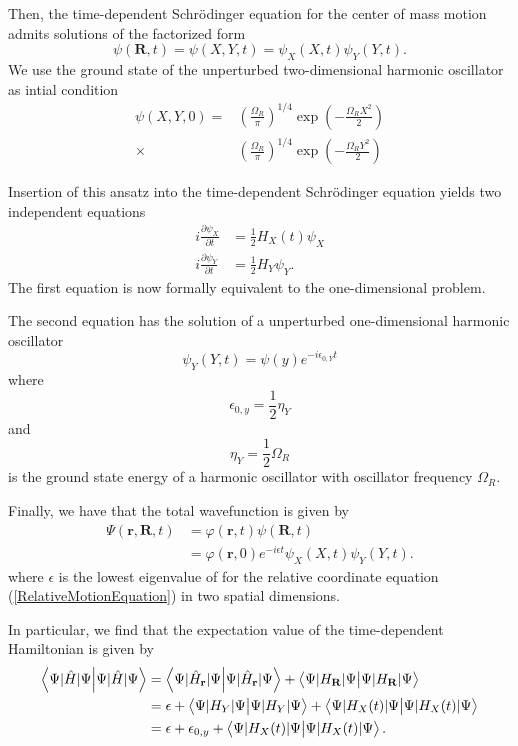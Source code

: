 \documentclass[aip,jcp,reprint,floatfix]{revtex4-1}
\begin{document}
\begin{appendices}
Then, the time-dependent Schrödinger equation for the center of mass motion admits solutions of the factorized form
\begin{equation}
    \psi(\mathbf{R},t) = \psi(X,Y,t) = \psi_X(X,t) \psi_Y(Y,t).
\end{equation}
We use the ground state of the unperturbed two-dimensional harmonic oscillator as intial condition
\begin{align}
    \psi(X,Y,0) = &\left( \frac{\Omega_R}{\pi} \right)^{1/4} \exp\left(-\frac{\Omega_R X^2}{2}\right) \nonumber \\ 
    \times &\left( \frac{\Omega_R}{\pi} \right)^{1/4} \exp\left(-\frac{\Omega_R Y^2}{2}\right)
\end{align}

Insertion of this ansatz into the time-dependent Schrödinger equation yields two independent equations 
\begin{align}
    i \frac{\partial \psi_X}{\partial t} &= \frac{1}{2} H_X(t) \psi_X \\
    i \frac{\partial \psi_Y}{\partial t} &= \frac{1}{2} H_Y \psi_Y. 
\end{align}
The first equation is now formally equivalent to the one-dimensional problem. 

The second equation has the solution of a unperturbed one-dimensional harmonic oscillator 
\begin{equation}
    \psi_Y(Y,t) = \psi(y) e^{-i \epsilon_{0,Y} t}
\end{equation}
where \begin{equation}
    \epsilon_{0,y} = \frac{1}{2}\eta_Y
\end{equation} 
 and 
\begin{equation}
    \eta_Y = \frac{1}{2}\Omega_R
\end{equation}
is the ground state energy of a harmonic oscillator with oscillator frequency $\Omega_R$.

Finally, we have that the total wavefunction is given by 
\begin{align}
 \Psi(\mathbf{r},\mathbf{R},t) &= \varphi(\mathbf{r},t) \psi(\mathbf{R},t) \nonumber \\
 &= \varphi(\mathbf{r},0)e^{-i\epsilon t} \psi_X(X,t) \psi_Y(Y,t).
\end{align}
where $\epsilon$ is the lowest eigenvalue of for the relative coordinate equation (\ref{RelativeMotionEquation}) in two spatial dimensions.

In particular, we find that the expectation value of the time-dependent Hamiltonian is given by 
\begin{align}
    \braket{\Psi|\hat{H}|\Psi} &= \braket{\Psi|\hat{H}_\mathbf{r}|\Psi} + \braket{\Psi|H_\mathbf{R}|\Psi} \nonumber \\ 
    &= \epsilon + \braket{\Psi|H_Y|\Psi} + \braket{\Psi|H_X(t)|\Psi} \nonumber \\
    &= \epsilon + \epsilon_{0,y} + \braket{\Psi|H_X(t)|\Psi}.
\end{align}


\end{appendices}
\end{document}
